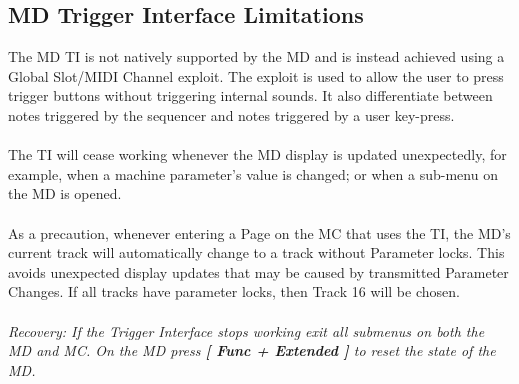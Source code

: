 \subsection{MD Trigger Interface Limitations}
The MD TI is not natively supported by the MD and is instead achieved using a Global Slot/MIDI Channel exploit. The exploit is used to allow the user to press trigger buttons without triggering internal sounds. It also differentiate between notes triggered by the sequencer and notes triggered by a user key-press.\\
\\
The TI will cease working whenever the MD display is updated unexpectedly, for example, when a machine parameter's value is changed; or when a sub-menu on the MD is opened.\\
\\
As a precaution, whenever entering a Page on the MC that uses the TI, the MD's current track will automatically change to a track without Parameter locks. This avoids unexpected display updates that may be caused by transmitted Parameter Changes. If all tracks have parameter locks, then Track 16 will be chosen.\\
\\
\textit{Recovery: If the Trigger Interface stops working exit all submenus on both the MD and MC. On the MD press \textbf{[ Func + Extended ]} to reset the state of the MD.}


